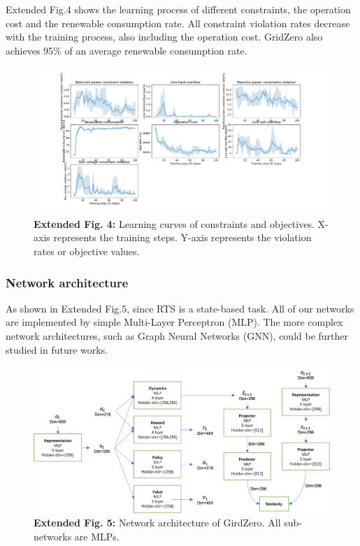 Extended Fig.4 shows the learning process of different constraints, the operation cost and the renewable consumption rate. All constraint violation rates decrease with the training process, also including the operation cost. GridZero also achieves 95\% of an average renewable consumption rate.
\begin{figure}[h]
    \centering
    \includegraphics[width=1.0\linewidth]{fig/constraint_learning.pdf}
    \captionsetup{labelformat=empty}
    \caption{\textbf{Extended Fig. 4:} Learning curves of constraints and objectives. X-axis represents the training steps. Y-axis represents the violation rates or objective values.}
    \label{fig:my_label}
\end{figure}

\subsubsection*{Network architecture}
As shown in  Extended Fig.5, since RTS is a state-based task. All of our networks are implemented by simple Multi-Layer Perceptron (MLP). The more complex network architectures, such as Graph Neural Networks (GNN), could be further studied in future works.
\begin{figure}[h]
    \centering
    \includegraphics[width=1.0\linewidth]{fig/net_arch.png}
    \captionsetup{labelformat=empty}
    \caption{\textbf{Extended Fig. 5:} Network architecture of GirdZero. All sub-networks are MLPs.}
    \label{fig:net_arch}
\end{figure}

